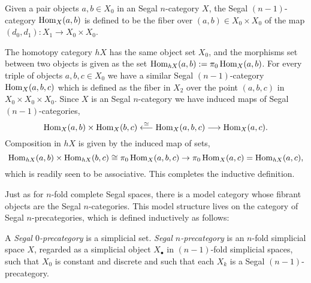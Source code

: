 \documentclass[a4paper]{amsart}
\begin{document}
{Given a pair objects $a,b \in X_0$ in an  Segal $n$-category $X$, the  Segal $(n-1)$-category $\operatorname{Hom}_X(a,b)$ is defined to be the fiber 
over $(a,b) \in X_0 \times X_0$ of the map $(d_0, d_1): X_1 \to X_0 \times X_0$.  
\begin{center}
\end{center}
The homotopy category $\mathit{h}X$ has the same object set $X_0$, and the morphisms set between two objects is given as the set $\operatorname{Hom}_{\mathit{h}X}(a,b) := \pi_0 \operatorname{Hom}_X(a,b)$.  For every triple of objects $a,b,c \in X_0$ we have a similar  Segal $(n-1)$-category $\operatorname{Hom}_X(a,b,c)$ which is defined as the fiber in $X_2$ over the point $(a,b,c)$ in $X_0 \times X_0 \times X_0$. Since $X$ is an  Segal $n$-category we have induced maps of  Segal $(n-1)$-categories,
\begin{equation*}
	\operatorname{Hom}_X(a,b) \times \operatorname{Hom}_X(b,c) \stackrel{\simeq}{\longleftarrow} \operatorname{Hom}_X(a,b,c) \stackrel{}{\longrightarrow} \operatorname{Hom}_X(a,c).
\end{equation*}
Composition in $\mathit{h}X$ is given by the induced map of sets,
\begin{equation*}
	 \operatorname{Hom}_{\mathit{h}X}(a,b) \times \operatorname{Hom}_{\mathit{h}X}(b,c) \cong \pi_0 \operatorname{Hom}_X(a,b,c)\to \pi_0 \operatorname{Hom}_X(a,c) = \operatorname{Hom}_{\mathit{h}X}(a,c),
\end{equation*}
which is readily seen to be associative. This completes the inductive definition.} Just as for $n$-fold complete Segal spaces, there is a model category whose fibrant objects are the Segal $n$-categories. This model structure lives on the category of Segal $n$-precategories, which is defined inductively as follows:

\begin{definition}
	A {\em Segal $0$-precategory} is a simplicial set. {\em Segal $n$-precategory} is an $n$-fold simplicial space $X$, regarded as a simplicial object $X_\bullet$ in $(n-1)$-fold simplicial spaces, such that $X_0$ is constant and discrete and such that each $X_k$ is a  Segal $(n-1)$-precategory. 
\end{definition}
\end{document}
